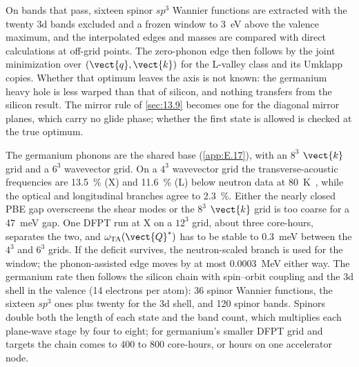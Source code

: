On bands that pass, sixteen spinor $sp^3$ Wannier functions are extracted with the twenty 3d bands excluded and a frozen window to \SI{3}{eV} above the valence maximum, and the interpolated edges and masses are compared with direct calculations at off-grid points. The zero-phonon edge then follows by the joint minimization over $(\vect{q},\vect{k})$ for the L-valley class and its Umklapp copies. Whether that optimum leaves the axis is not known: the germanium heavy hole is less warped than that of silicon, and nothing transfers from the silicon result. The mirror rule of \cref{sec:13.9} becomes one for the diagonal mirror planes, which carry no glide phase; whether the first state is allowed is checked at the true optimum.

The germanium phonons are the shared base (\cref{app:E.17}), with an $8^3$ $\vect{k}$ grid and a $6^3$ wavevector grid. On a $4^3$ wavevector grid the transverse-acoustic frequencies are \SI{13.5}{\percent} (X) and \SI{11.6}{\percent} (L) below neutron data at \SI{80}{K}~\cite{nilsson1971phonon}, while the optical and longitudinal branches agree to \SI{2.3}{\percent}. Either the nearly closed PBE gap overscreens the shear modes or the $8^3$ $\vect{k}$ grid is too coarse for a \SI{47}{meV} gap. One DFPT run at X on a $12^3$ grid, about three core-hours, separates the two, and $\omega_{\mathrm{TA}}(\vect{Q}^*)$ has to be stable to \SI{0.3}{meV} between the $4^3$ and $6^3$ grids. If the deficit survives, the neutron-scaled branch is used for the window; the phonon-assisted edge moves by at most \SI{0.0003}{MeV} either way. The germanium rate then follows the silicon chain with spin--orbit coupling and the 3d shell in the valence (14 electrons per atom): 36 spinor Wannier functions, the sixteen $sp^3$ ones plus twenty for the 3d shell, and 120 spinor bands. Spinors double both the length of each state and the band count, which multiplies each plane-wave stage by four to eight; for germanium's smaller DFPT grid and targets the chain comes to 400 to 800 core-hours, or hours on one accelerator node.


